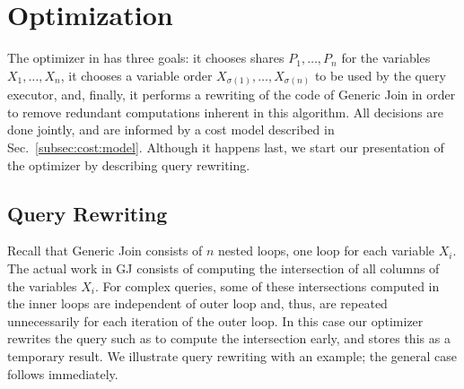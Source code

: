 \section{Optimization}\label{sec:opt}

The optimizer in \name has three goals: it chooses shares
$P_1, \ldots, P_n$ for the variables $X_1, \ldots, X_n$, it chooses a
variable order $X_{\sigma(1)}, \ldots, X_{\sigma(n)}$ to be used by
the query executor, and, finally, it performs a rewriting of the code
of Generic Join in order to remove redundant computations inherent in
this algorithm.  All decisions are done jointly, and are informed by a
cost model described in Sec.~\ref{subsec:cost:model}.
Although it happens last, we start our presentation of the optimizer
by describing query rewriting.

\subsection{Query Rewriting}
\label{subsec:rewrite}

Recall that Generic Join consists of $n$ nested loops, one loop for
each variable $X_i$.  The actual work in GJ consists of computing the
intersection of all columns of the variables $X_i$.  For complex
queries, some of these intersections computed in the inner loops are
independent of outer loop and, thus, are repeated unnecessarily for
each iteration of the outer loop.  In this case our optimizer rewrites
the query such as to compute the intersection early, and stores this
as a temporary result.  We illustrate query rewriting with an example;
the general case follows immediately.

